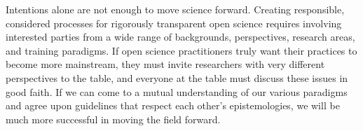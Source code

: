 \documentclass[authordate, meta, issue]{jote-new-article}
\begin{document}
Intentions alone are not enough to move science forward. Creating responsible, considered processes for rigorously transparent open science requires involving interested parties from a wide range of backgrounds, perspectives, research areas, and training paradigms. If open science practitioners truly want their practices to become more mainstream, they must invite researchers with very different perspectives to the table, and everyone at the table must discuss these issues in good faith. If we can come to a mutual understanding of our various paradigms and agree upon guidelines that respect each other’s epistemologies, we will be much more successful in moving the field forward.



\printbibliography
\end{document}
